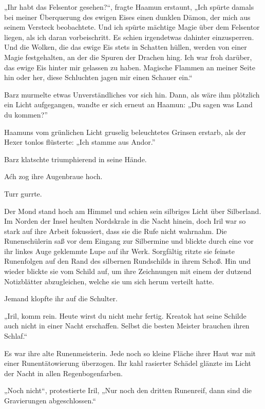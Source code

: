 „Ihr habt das Felsentor gesehen?“, fragte Haamun erstaunt, „Ich spürte damals bei meiner Überquerung des ewigen Eises einen dunklen Dämon, der mich aus seinem Versteck beobachtete. Und ich spürte mächtige Magie über dem Felsentor liegen, als ich daran vorbeischritt. Es schien irgendetwas dahinter einzusperren. Und die Wolken, die das ewige Eis stets in Schatten hüllen, werden von einer Magie festgehalten, an der die Spuren der Drachen hing. Ich war froh darüber, das ewige Eis hinter mir gelassen zu haben. Magische Flammen an meiner Seite hin oder her, diese Schluchten jagen mir einen Schauer ein.“

Barz murmelte etwas Unverständliches vor sich hin. Dann, als wäre ihm plötzlich ein Licht aufgegangen, wandte er sich erneut an Haamun: „Du sagen was Land du kommen?”

Haamuns vom grünlichen Licht gruselig beleuchtetes Grinsen erstarb, als der Hexer tonlos flüsterte: „Ich stamme aus Andor.”

Barz klatschte triumphierend in seine Hände.

Aćh zog ihre Augenbraue hoch.

Turr gurrte.



\trennzeichen



Der Mond stand hoch am Himmel und schien sein silbriges Licht über Silberland. Im Norden der Insel heulten Nordskrale in die Nacht hinein, doch Iril war so stark auf ihre Arbeit fokussiert, dass sie die Rufe nicht wahrnahm. Die Runenschülerin saß vor dem Eingang zur Silbermine und blickte durch eine vor ihr linkes Auge geklemmte Lupe auf ihr Werk. Sorgfältig ritzte sie feinste Runenfolgen auf den Rand des silbernen Rundschilds in ihrem Schoß. Hin und wieder blickte sie vom Schild auf, um ihre Zeichnungen mit einem der dutzend Notizblätter abzugleichen, welche sie um sich herum verteilt hatte.

Jemand klopfte ihr auf die Schulter.

„Iril, komm rein. Heute wirst du nicht mehr fertig. Kreatok hat seine Schilde auch nicht in einer Nacht erschaffen. Selbst die besten Meister brauchen ihren Schlaf.“

Es war ihre alte Runenmeisterin. Jede noch so kleine Fläche ihrer Haut war mit einer Runentätowierung überzogen. Ihr kahl rasierter Schädel glänzte im Licht der Nacht in allen Regenbogenfarben.

„Noch nicht“, protestierte Iril, „Nur noch den dritten Runenreif, dann sind die Gravierungen abgeschlossen.“

